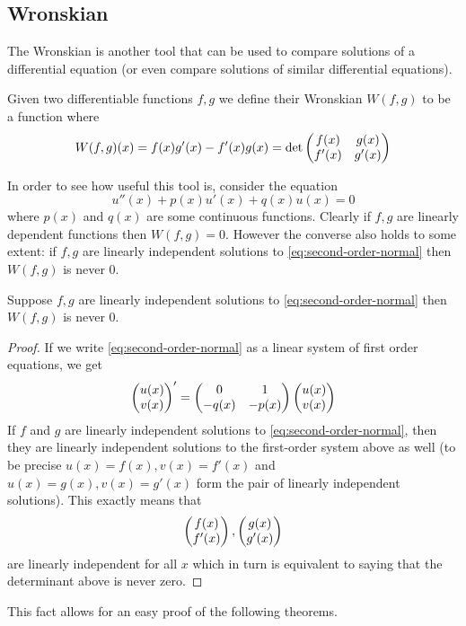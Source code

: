\subsection{Wronskian}
The Wronskian is another tool that can be used to compare solutions of a differential equation (or even compare solutions of similar differential equations).
\begin{definition}[Wronskian]
Given two differentiable functions $f, g$ we define their Wronskian $W(f, g)$ to be a function where
$$ W(f, g)(x) = f(x) g'(x) - f'(x) g(x) = \det \begin{pmatrix} f(x) & g(x)\\f'(x) & g'(x) \end{pmatrix} $$
\end{definition}

In order to see how useful this tool is, consider the equation
\begin{equation}\label{eq:second-order-normal}
    u''(x) + p(x) u'(x) + q(x) u(x) = 0 
\end{equation}
where $p(x)$ and $q(x)$ are some continuous functions. 
Clearly if $f, g$ are linearly dependent functions then $W(f, g) = 0$. However the converse also holds to some extent: if $f, g$ are linearly independent solutions to \autoref{eq:second-order-normal} then $W(f, g)$ is never 0.

\begin{lemma}
Suppose $f, g$ are linearly independent solutions to \autoref{eq:second-order-normal} then $W(f, g)$ is never 0.
\end{lemma}
\begin{proof}
If we write \autoref{eq:second-order-normal} as a linear system of first order equations, we get
\begin{align*}
    \begin{pmatrix} u(x) \\ v(x) \end{pmatrix}' = \begin{pmatrix} 0 & 1\\-q(x) & -p(x) \end{pmatrix} \begin{pmatrix} u(x) \\ v(x) \end{pmatrix}
\end{align*}
If $f$ and $g$ are linearly independent solutions to \autoref{eq:second-order-normal}, then they are linearly independent solutions to the first-order system above as well (to be precise $u(x) = f(x), v(x) = f'(x)$ and $u(x) = g(x), v(x) = g'(x)$ form the pair of linearly independent solutions).
This exactly means that
$$ \begin{pmatrix} f(x)\\f'(x) \end{pmatrix}, \begin{pmatrix} g(x) \\ g'(x) \end{pmatrix} $$
are linearly independent for all $x$ which in turn is equivalent to saying that the determinant above is never zero.
\end{proof}
This fact allows for an easy proof of the following theorems.

